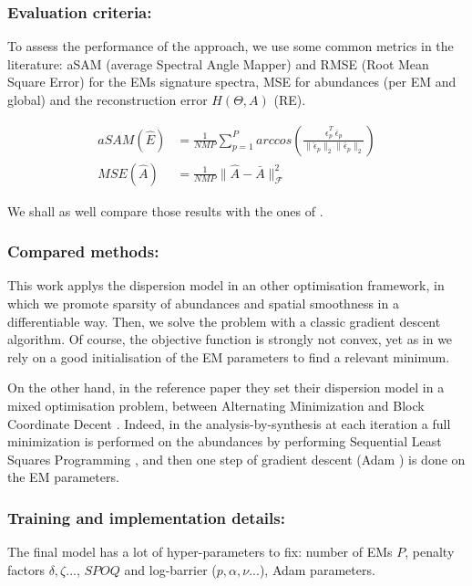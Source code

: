 \documentclass{article}
\begin{document}
\subsubsection{Evaluation criteria:}
To assess the performance of the approach, we use some common metrics in the literature: aSAM (average Spectral Angle Mapper) and RMSE (Root Mean Square Error) for the EMs signature spectra, MSE for abundances (per EM and global) and the reconstruction error $H(\Theta, A)$ (RE).

\begin{align*}
  aSAM(\widehat{E}) &= \frac{1}{N M P} \sum_{p=1}^P arccos \left( \frac{\widehat{\epsilon}_p^T\ \bar{\epsilon}_p}{\| \widehat{\epsilon}_p \|_2 \| \bar{\epsilon}_p \|_2} \right)\\
  MSE(\widehat{A}) &= \frac{1}{N M P} \| \widehat{A} - \bar{A} \|_{\mathcal{F}}^2
\end{align*}

We shall as well compare those results with the ones of \citet{janiczek_differentiable_2020}.

\subsubsection{Compared methods:}
This work applys the dispersion model in an other optimisation framework, in which we promote sparsity of abundances and spatial smoothness in a differentiable way. Then, we solve the problem with a classic gradient descent algorithm. Of course, the objective function is strongly not convex, yet as in \citet{janiczek_differentiable_2020} we rely on a good initialisation of the EM parameters to find a relevant minimum.

On the other hand, in the reference paper they set their dispersion model in a mixed optimisation problem, between Alternating Minimization \citep{bolte_proximal_2014} and Block Coordinate Decent \citep{marecek2014}. Indeed, in the analysis-by-synthesis at each iteration a full minimization is performed on the abundances by performing Sequential Least Squares Programming \citep{kraft1988}, and then one step of gradient descent (Adam \citep{kingma_adam_2017}) is done on the EM parameters.

\subsubsection{Training and implementation details:}
The final model has a lot of hyper-parameters to fix: number of EMs $P$, penalty factors $\delta, \zeta...$, $SPOQ$ and log-barrier ($p, \alpha, \nu...$), Adam parameters.
\end{document}
